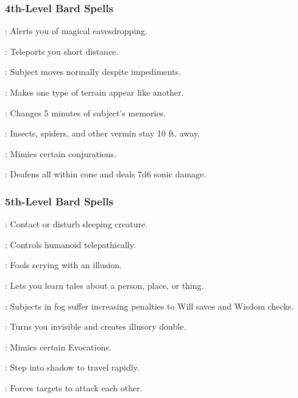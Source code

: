 \subsubsection{4th-Level Bard Spells}
\begin{list}{}{\leftmargin=1em}
 \item {}: Alerts you of magical eavesdropping.
 \item {}: Teleports you short distance.
 \item {}: Subject moves normally despite impediments.
 \item {}: Makes one type of terrain appear like another.
 \item {}: Changes 5 minutes of subject's memories.
 \item {}: Insects, spiders, and other vermin stay 10 ft. away.
 \item {}: Mimics certain conjurations.
 \item {}: Deafens all within cone and deals 7d6 sonic damage.
\end{list}
\subsubsection{5th-Level Bard Spells}
\begin{list}{}{\leftmargin=1em}
\item {}: Contact or disturb sleeping creature.
\item {}: Controls humanoid telepathically.
\item {}: Fools scrying with an illusion.
\item {}: Lets you learn tales about a person, place, or thing.
\item {}: Subjects in fog suffer increasing penalties to Will saves and Wisdom checks.
\item {}: Turns you invisible and creates illusory double.
\item {}: Mimics certain Evocations.
\item {}: Step into shadow to travel rapidly.
\item {}: Forces targets to attack each other.
\end{list}
